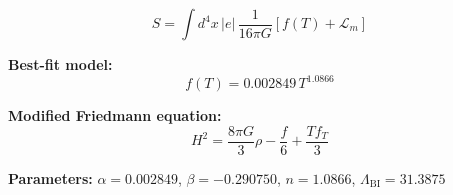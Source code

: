 
\begin{equation}
  S = \int d^4x \, |e| \, \frac{1}{16\pi G} \left[ f(T) + \mathcal{L}_m \right]
\end{equation}

\textbf{Best-fit model:}
\begin{equation}
  f(T) = 0.002849 \, T^{1.0866}
\end{equation}

\textbf{Modified Friedmann equation:}
\begin{equation}
  H^2 = \frac{8\pi G}{3} \rho - \frac{f}{6} + \frac{T f_T}{3}
\end{equation}

\textbf{Parameters:}
$\alpha = 0.002849$, \quad
$\beta = -0.290750$, \quad
$n = 1.0866$, \quad
$\Lambda_{\text{BI}} = 31.3875$